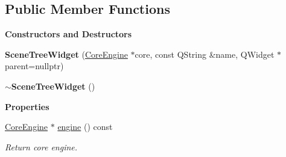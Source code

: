 \subsection*{Public Member Functions}
\begin{Indent}\textbf{ Constructors and Destructors}\par
\begin{DoxyCompactItemize}
\item 
\mbox{\label{classrev_1_1_view_1_1_scene_tree_widget_ae7e37ae420064fd1650997200aa5b687}} 
{\bfseries Scene\+Tree\+Widget} (\mbox{\hyperlink{classrev_1_1_core_engine}{Core\+Engine}} $\ast$core, const Q\+String \&name, Q\+Widget $\ast$parent=nullptr)
\item 
\mbox{\label{classrev_1_1_view_1_1_scene_tree_widget_a2e114db798492687aa8a9d0f12745b34}} 
{\bfseries $\sim$\+Scene\+Tree\+Widget} ()
\end{DoxyCompactItemize}
\end{Indent}
\begin{Indent}\textbf{ Properties}\par
\begin{DoxyCompactItemize}
\item 
\mbox{\label{classrev_1_1_view_1_1_scene_tree_widget_a0276164c2bf59f8e7e39ed9a82ad7b09}} 
\mbox{\hyperlink{classrev_1_1_core_engine}{Core\+Engine}} $\ast$ \mbox{\hyperlink{classrev_1_1_view_1_1_scene_tree_widget_a0276164c2bf59f8e7e39ed9a82ad7b09}{engine}} () const
\begin{DoxyCompactList}\small\item\em Return core engine. \end{DoxyCompactList}\end{DoxyCompactItemize}
\end{Indent}
